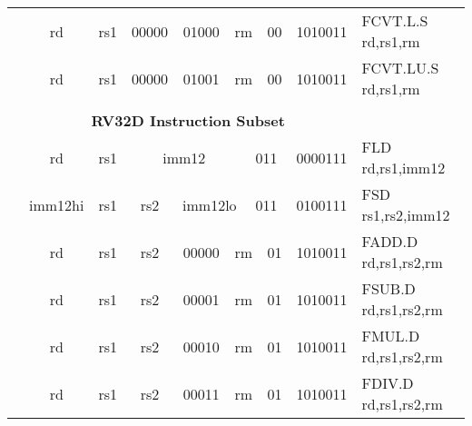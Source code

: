 \begin{table}[p]
\begin{small}
\begin{center}
\begin{tabular}{rccccccccccl}
&
\multicolumn{1}{|c|}{rd} &
\multicolumn{1}{c|}{rs1} &
\multicolumn{1}{c|}{00000} &
\multicolumn{3}{c|}{01000} &
\multicolumn{2}{c|}{rm} &
\multicolumn{1}{c|}{00} &
\multicolumn{1}{c|}{1010011} & FCVT.L.S rd,rs1,rm \\
\cline{2-11}
  

&
\multicolumn{1}{|c|}{rd} &
\multicolumn{1}{c|}{rs1} &
\multicolumn{1}{c|}{00000} &
\multicolumn{3}{c|}{01001} &
\multicolumn{2}{c|}{rm} &
\multicolumn{1}{c|}{00} &
\multicolumn{1}{c|}{1010011} & FCVT.LU.S rd,rs1,rm \\
\cline{2-11}
  

&
\multicolumn{10}{c}{} & \\
&
\multicolumn{10}{c}{\bf RV32D Instruction Subset} & \\
\cline{2-11}
  

&
\multicolumn{1}{|c|}{rd} &
\multicolumn{1}{c|}{rs1} &
\multicolumn{5}{c|}{imm12} &
\multicolumn{2}{c|}{011} &
\multicolumn{1}{c|}{0000111} & FLD rd,rs1,imm12 \\
\cline{2-11}
  

&
\multicolumn{1}{|c|}{imm12hi} &
\multicolumn{1}{c|}{rs1} &
\multicolumn{1}{c|}{rs2} &
\multicolumn{4}{c|}{imm12lo} &
\multicolumn{2}{c|}{011} &
\multicolumn{1}{c|}{0100111} & FSD rs1,rs2,imm12 \\
\cline{2-11}
  

&
\multicolumn{1}{|c|}{rd} &
\multicolumn{1}{c|}{rs1} &
\multicolumn{1}{c|}{rs2} &
\multicolumn{3}{c|}{00000} &
\multicolumn{2}{c|}{rm} &
\multicolumn{1}{c|}{01} &
\multicolumn{1}{c|}{1010011} & FADD.D rd,rs1,rs2,rm \\
\cline{2-11}
  

&
\multicolumn{1}{|c|}{rd} &
\multicolumn{1}{c|}{rs1} &
\multicolumn{1}{c|}{rs2} &
\multicolumn{3}{c|}{00001} &
\multicolumn{2}{c|}{rm} &
\multicolumn{1}{c|}{01} &
\multicolumn{1}{c|}{1010011} & FSUB.D rd,rs1,rs2,rm \\
\cline{2-11}
  

&
\multicolumn{1}{|c|}{rd} &
\multicolumn{1}{c|}{rs1} &
\multicolumn{1}{c|}{rs2} &
\multicolumn{3}{c|}{00010} &
\multicolumn{2}{c|}{rm} &
\multicolumn{1}{c|}{01} &
\multicolumn{1}{c|}{1010011} & FMUL.D rd,rs1,rs2,rm \\
\cline{2-11}
  

&
\multicolumn{1}{|c|}{rd} &
\multicolumn{1}{c|}{rs1} &
\multicolumn{1}{c|}{rs2} &
\multicolumn{3}{c|}{00011} &
\multicolumn{2}{c|}{rm} &
\multicolumn{1}{c|}{01} &
\multicolumn{1}{c|}{1010011} & FDIV.D rd,rs1,rs2,rm \\
\cline{2-11}
  


\end{tabular}
\end{center}
\end{small}
\end{table}
